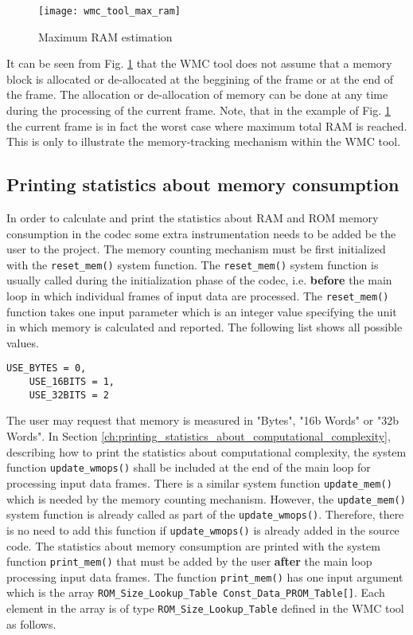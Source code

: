 \begin{figure}[hbtp]
\begin{center}
\texttt{[image: wmc\_tool\_max\_ram]}
\end{center}
\caption{Maximum RAM estimation}
\label{fig:wmc_tool_max_ram}
\end{figure}

It can be seen from Fig. \ref{fig:wmc_tool_max_ram} that the WMC tool does not assume that a memory block is allocated or de-allocated at the beggining of the frame or at the end of the frame. The allocation or de-allocation of memory can be done at any time during the processing of the current frame. Note, that in the example of Fig. \ref{fig:wmc_tool_max_ram} the current frame is in fact the worst case where maximum total RAM is reached. This is only to illustrate the memory-tracking mechanism within the WMC tool.

\subsection{Printing statistics about memory consumption}
\label{ch:printing_statistics_about_memory_consumption}

In order to calculate and print the statistics about RAM and ROM memory consumption in the codec some extra instrumentation needs to be added be the user to the project. The memory counting mechanism must be first initialized with the \verb|reset_mem()| system function. The \verb|reset_mem()| system function is usually called during the initialization phase of the codec, i.e. \textbf{before} the main loop in which individual frames of input data are processed. The \verb|reset_mem()| function takes one input parameter which is an integer value specifying the unit in which memory is calculated and reported. The following list shows all possible values.

\begin{Verbatim}[fontsize=\small]
    USE_BYTES = 0,
    USE_16BITS = 1,
    USE_32BITS = 2
\end{Verbatim}

The user may request that memory is measured in "Bytes", "16b Words" or "32b Words". In Section \ref{ch:printing_statistics_about_computational_complexity}, describing how to print the statistics about computational complexity, the system function \verb|update_wmops()| shall be included at the end of the main loop for processing input data frames. There is a similar system function \verb|update_mem()| which is needed by the memory counting mechanism. However, the \verb|update_mem()| system function is already called as part of the \verb|update_wmops()|. Therefore, there is no need to add this function if \verb|update_wmops()| is already added in the source code. The statistics about memory consumption are printed with the system function \verb|print_mem()| that must be added by the user \textbf{after} the main loop processing input data frames. The function \verb|print_mem()| has one input argument which is the array \verb|ROM_Size_Lookup_Table Const_Data_PROM_Table[]|. Each element in the array is of type \verb|ROM_Size_Lookup_Table| defined in the WMC tool as follows.

